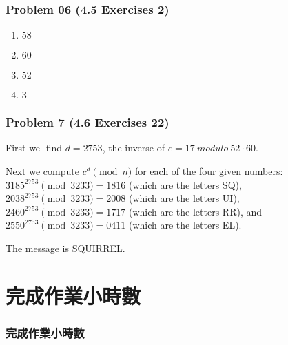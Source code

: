 \documentclass[14pt,hyperref={bookmarks=false}]{beamer}
\begin{document}
	\begin{frame}
	\frametitle{Problem 06 (4.5 Exercises 2)}
	\fontsize{10}{10pt}\selectfont
	\begin{enumerate}[label=(\alph*)]
	\item $58$
	\item $60$
	\item $52$
	\item $3$
	\end{enumerate}
	\end{frame}

	\begin{frame}
	\frametitle{Problem 7 (4.6 Exercises 22)}
	\fontsize{11}{12pt}\selectfont
	First we find $d = 2753$, the inverse of $e = 17~modulo~52 · 60$. \\
 
    \vspace*{0.3cm}
    
	Next we compute $c^d \pmod{n}$ for each of the four given numbers:\\ $3185^{2753} \pmod{3233} = 1816$ (which are the letters SQ),\\
$2038^{2753} \pmod{3233} = 2008$ (which are the letters UI),\\
$2460^{2753} \pmod{3233} = 1717$ (which are the letters RR), and \\
$2550^{2753} \pmod{3233} = 0411$ (which are the letters EL).\\

    \vspace*{0.3cm}
    
    The message is SQUIRREL.
	\end{frame}

		
\section{完成作業小時數}

\begin{frame}
\frametitle{完成作業小時數}
\centerline{\fontsize{16}{16pt}}	
\end{frame}

\end{document}
